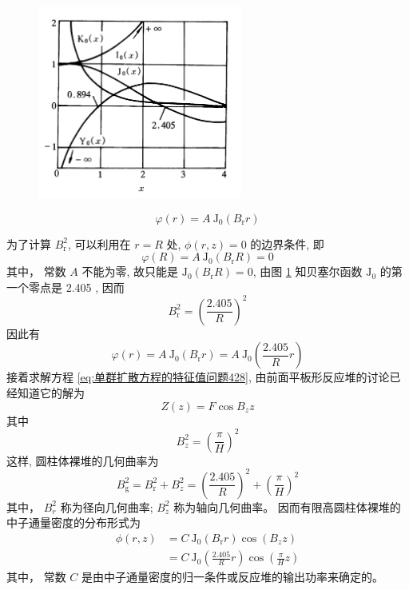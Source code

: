 \documentclass{Sichuan Normal University}
\begin{document}
\begin{figure}[H]
    \centering
    \includegraphics[width=0.6\textwidth]{./figure/零阶贝赛尔函数曲线.png}
    \label{fig:零阶贝赛尔函数曲线}
    \end{figure}

\begin{equation}
\varphi(r)=A \mathrm{~J}_0\left(B_{\mathrm{r}} r\right)
\end{equation}

为了计算 $B_{\mathrm{r}}^2$, 可以利用在 $r=R$ 处, $\phi(r, z)=0$ 的边界条件, 即
\begin{equation}
\varphi(R)=A \mathrm{~J}_0\left(B_{\mathrm{r}} R\right)=0
\end{equation}其中， 常数 $A$ 不能为零, 故只能是 $\mathrm{J}_0\left(B_{\mathrm{r}} R\right)=0$, 由图 \ref{fig:零阶贝赛尔函数曲线} 知贝塞尔函数 $\mathrm{J}_0$ 的第一个零点是 2.405 , 因而
\begin{equation}
    B_{\mathrm{r}}^2=\left(\frac{2.405}{R}\right)^2
\end{equation}
因此有
\begin{equation}
    \varphi(r)=A \mathrm{~J}_0\left(B_{\mathrm{r}} r\right)=A \mathrm{~J}_0\left(\frac{2.405}{R} r\right)
\end{equation}
接着求解方程 \eqref{eq:单群扩散方程的特征值问题428}, 由前面平板形反应堆的讨论已经知道它的解为
\begin{equation}
Z(z)=F \cos B_z z
\end{equation}其中
\begin{equation}
B_z^2=\left(\frac{\pi}{H}\right)^2
\end{equation}
这样, 圆柱体裸堆的几何曲率为
\begin{equation}
B_{\mathrm{g}}^2=B_{\mathrm{r}}^2+B_z^2=\left(\frac{2.405}{R}\right)^2+\left(\frac{\pi}{H}\right)^2
\end{equation}其中， $B_r^2$ 称为径向几何曲率; $B_z^2$ 称为轴向几何曲率。
因而有限高圆柱体裸堆的中子通量密度的分布形式为
\begin{equation}
\begin{aligned}
\phi(r, z) & =C \mathrm{~J}_0\left(B_{\mathrm{r}} r\right) \cos \left(B_z z\right) \\
& =C \mathrm{~J}_0\left(\frac{2.405}{R} r\right) \cos \left(\frac{\pi}{H} z\right)
\end{aligned}
\label{eq:单群扩散方程的特征值问题436}
\end{equation}其中， 常数 $C$ 是由中子通量密度的归一条件或反应堆的输出功率来确定的。
\end{document}
